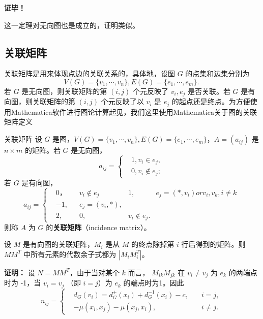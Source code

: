 \textbf{证毕！}

这一定理对无向图也是成立的，证明类似。
\subsection{关联矩阵}

关联矩阵是用来体现点边的关联关系的，具体地，设图 $G$ 的点集和边集分别为 
\begin{equation}\label{eq_RepGra_1}
V(G)=\{v_1,\cdots,v_n\},E(G)=\{e_1,\cdots,e_m\}.~
\end{equation}
若 $G$ 是无向图，则关联矩阵的第 $(i,j)$ 个元反映了 $v_i,e_j$ 是否关联。若 $G$ 是有向图，则关联矩阵的第 $(i,j)$ 个元反映了以 $v_i$ 是 $e_j$ 的起点还是终点。为方便使用Mathematica软件进行图论计算起见，我们这里使用Mathematica关于图的关联矩阵定义
\begin{definition}{关联矩阵}
设 $G$ 是图，$V(G)=\{v_1,\cdots,v_n\},E(G)=\{e_1,\cdots,e_m\}$，$A=(a_{ij})$ 是 $n\times m$ 的矩阵。若 $G$ 是无向图，
\begin{equation}
a_{ij}=\left\{\begin{aligned}
&1, v_i\in e_j,\\
&0, v_i\not\in e_j;
\end{aligned}\right.~
\end{equation}
若 $G$ 是有向图，
\begin{equation}
a_{ij}=\left\{\begin{aligned}
&0，\quad &v_i\notin e_j
&1, &e_j=(*,v_i) or {v_i,v_k},i\neq k\\
&-1, &e_j=(v_i,*) ,\\
&2,
&0,&v_i\not\in e_j.
\end{aligned}\right.~
\end{equation}
则称 $A$ 为 $G$ 的\textbf{关联矩阵}（incidence matrix）。
\end{definition}


\begin{theorem}{}
设 $M$ 是有向图的关联矩阵，$M_i$ 是从 $M$ 的终点除掉第 $i$ 行后得到的矩阵。则 $MM^T$ 中所有元素的代数余子式都为 $|M_iM_i^T|$。

\end{theorem}
\textbf{证明：}
设 $N=MM^T$，由于当对某个 $k$ 而言， $M_{ik}M_{jk}$ 在 $v_i\neq v_j$ 为 $e_k$ 的两端点时为 -1，当 $v_i=v_j$ （即 $i=j$）为 $e_k$ 的端点时为1。因此
\begin{equation}
n_{ij}=\left\{\begin{aligned}
&d_G(v_i)=d_G^+(x_i)+d_G^{-1}(x_i)-c,\quad &i=j,\\
&-\mu(x_i,x_j)-\mu(x_j,x_i),\quad &i\neq j.
\end{aligned}\right.~
\end{equation}


